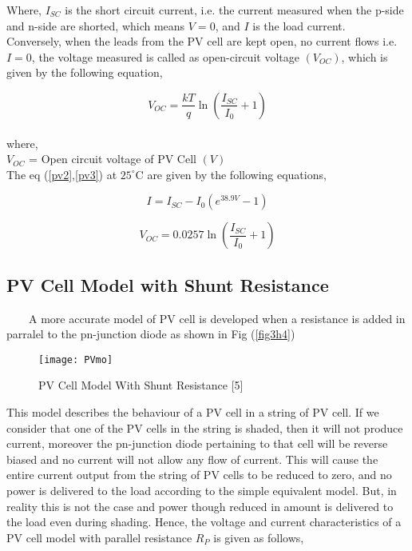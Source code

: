 Where, $I_{SC}$ is the short circuit current, i.e. the current measured when the p-side and n-side are shorted, which means $V=0$, and $I$ is the load current.\\

Conversely, when the leads from the PV cell are kept open, no current flows i.e. $I=0$, the voltage measured is called as open-circuit voltage $(V_{OC})$, which is given by the following equation,

\begin{equation}
\label{pv3}
V_{OC} = \frac{kT}{q}\ln \left (\frac{I_{SC}}{I_{0}}+1\right )
\end{equation}\\
where,\\
$ V_{OC} $ = Open circuit voltage of PV Cell $ (V) $\\

The eq (\ref{pv2},\ref{pv3}) at $25^{\circ} \text{C}$ are given by the following equations,

\begin{equation}
\label{pv4}
I = I_{SC}-I_{0} \left(e^{38.9V}-1 \right )
\end{equation}

\begin{equation}
\label{pv5}
V_{OC} = 0.0257\ln \left (\frac{I_{SC}}{I_{0}}+1\right )
\end{equation} 



\subsection{PV Cell Model with Shunt Resistance}
\
\
\
\
A more accurate model of PV cell is developed when a resistance is added in parralel to the pn-junction diode as shown in Fig (\ref{fig3h4})

\begin{figure}[H]
\centering
\texttt{[image: PVmo]}
\caption{PV Cell Model With Shunt Resistance [5]}
\label{figc3h4} %
\end{figure}

This model describes the behaviour of a PV cell in a string of PV cell. If we consider that one of the PV cells in the string is shaded, then it will not produce current, moreover the pn-junction diode pertaining to that cell will be reverse biased and no current will not allow any flow of current. This will cause the entire current output from the string of PV cells to be reduced to zero, and no power is delivered to the load according to the simple equivalent model. But, in reality this is not the case and power though reduced in amount is delivered to the load even during shading. Hence, the voltage and current characteristics of a PV cell model with parallel resistance $R_{P}$ is given as follows,

